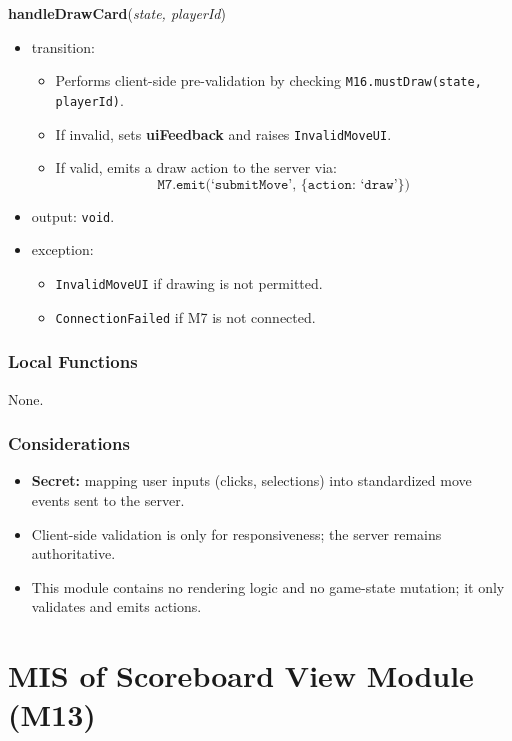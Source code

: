 \documentclass[12pt, titlepage]{article}
\begin{document}
\noindent\textbf{handleDrawCard}(\textit{state, playerId})
\begin{itemize}
    \item transition:
    \begin{itemize}
        \item Performs client-side pre-validation by checking \texttt{M16.mustDraw(state, playerId)}.
        \item If invalid, sets \textbf{uiFeedback} and raises \texttt{InvalidMoveUI}.
        \item If valid, emits a draw action to the server via:
        \[
            \texttt{M7.emit(`submitMove', \{action: `draw'\})}
        \]
    \end{itemize}
    \item output: \texttt{void}.
    \item exception:
    \begin{itemize}
        \item \texttt{InvalidMoveUI} if drawing is not permitted.
        \item \texttt{ConnectionFailed} if M7 is not connected.
    \end{itemize}
\end{itemize}

\subsubsection{Local Functions}
None.

\subsubsection{Considerations}
\begin{itemize}
    \item \textbf{Secret:} mapping user inputs (clicks, selections) into standardized move events sent to the server.
    \item Client-side validation is only for responsiveness; the server remains authoritative.
    \item This module contains no rendering logic and no game-state mutation; it only validates and emits actions.
\end{itemize}


\newpage
\section{MIS of Scoreboard View Module (M13)}\label{sec:scoreboard-view-module}
\end{document}
